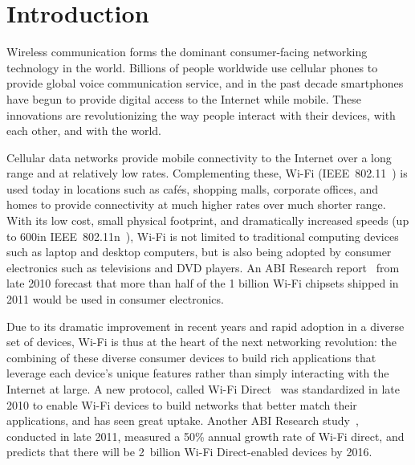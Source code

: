 \ifx\mainfile\undefined

\setcounter{chapter}{0} %
\fi

\cleardoublepage
\chapter{Introduction}
\label{chap:intro}

Wireless communication forms the dominant consumer-facing networking technology in the world. Billions of people worldwide use cellular phones to provide global voice communication service, and in the past decade smartphones have begun to provide digital access to the Internet while mobile. These innovations are revolutionizing the way people interact with their devices, with each other, and with the world.

Cellular data networks provide mobile connectivity to the Internet over a long range and at relatively low rates. Complementing these, Wi-Fi (IEEE~802.11~\cite{80211}) is used today in locations such as caf\'{e}s, shopping malls, corporate offices, and homes to provide connectivity at much higher rates over much shorter range. With its low cost, small physical footprint, and dramatically increased speeds (up to 600\Mbps in IEEE~802.11n~\cite{80211n}), Wi-Fi is not limited to traditional computing devices such as laptop and desktop computers, but is also being adopted by consumer electronics such as televisions and DVD players. An ABI Research report~\cite{ABI_Research_2010} from late 2010 forecast that more than half of the 1 billion Wi-Fi chipsets shipped in 2011 would be used in consumer electronics.

Due to its dramatic improvement in recent years and rapid adoption in a diverse set of devices, Wi-Fi is thus at the heart of the next networking revolution: the combining of these diverse consumer devices to build rich applications that leverage each device's unique features rather than simply interacting with the Internet at large. A new protocol, called Wi-Fi Direct~\cite{wifi_direct} was standardized in late 2010 to enable Wi-Fi devices to build networks that better match their applications, and has seen great uptake. Another ABI Research study~\cite{ABI_Research_2011}, conducted in late 2011, measured a 50\% annual growth rate of Wi-Fi direct, and predicts that there will be 2~billion Wi-Fi Direct-enabled devices by 2016.

